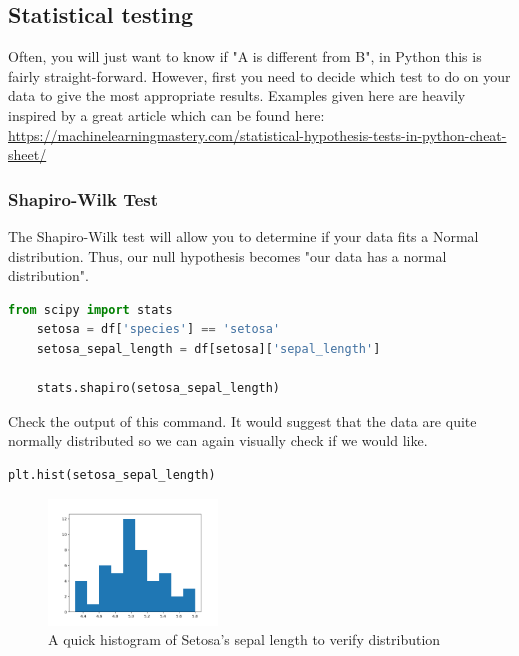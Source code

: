 \documentclass[12pt]{article}
\begin{document}
\subsection{Statistical testing} 

Often, you will just want to know if "A is different from B", in Python this is fairly straight-forward. However, first you need to decide which test to do on your data to give the most appropriate results. Examples given here are heavily inspired by a great article which can be found here: \href{https://machinelearningmastery.com/statistical-hypothesis-tests-in-python-cheat-sheet/}{https://machinelearningmastery.com/statistical-hypothesis-tests-in-python-cheat-sheet/}

\subsubsection{Shapiro-Wilk Test}

The Shapiro-Wilk test will allow you to determine if your data fits a Normal distribution. Thus, our null hypothesis becomes "our data has a normal distribution". 

\begin{lstlisting}[language=Python]
    from scipy import stats
    setosa = df['species'] == 'setosa'
    setosa_sepal_length = df[setosa]['sepal_length']

    stats.shapiro(setosa_sepal_length)
\end{lstlisting}

Check the output of this command. It would suggest that the data are quite normally distributed so we can again visually check if we would like.
\begin{lstlisting}[language=Python]
    plt.hist(setosa_sepal_length)
\end{lstlisting}

\begin{figure}[!h]
    \centering
    \includegraphics[width=0.4\textwidth]{figures/ssIM7.png}
    \caption{A quick histogram of Setosa's sepal length to verify distribution}
\end{figure}
\end{document}
